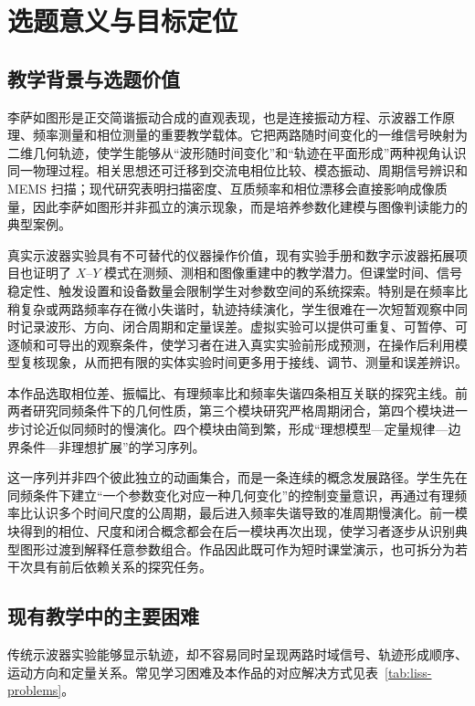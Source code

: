 \documentclass[UTF8,a4paper,zihao=-4]{ctexart}
\begin{document}
\section{选题意义与目标定位}

\subsection{教学背景与选题价值}
李萨如图形是正交简谐振动合成的直观表现，也是连接振动方程、示波器工作原理、频率测量和相位测量的重要教学载体\cite{cena2014,doll2007,hogan2019}。它把两路随时间变化的一维信号映射为二维几何轨迹，使学生能够从“波形随时间变化”和“轨迹在平面形成”两种视角认识同一物理过程。相关思想还可迁移到交流电相位比较、模态振动、周期信号辨识和 MEMS 扫描；现代研究表明扫描密度、互质频率和相位漂移会直接影响成像质量\cite{wang2020,birla2020,janin2022}，因此李萨如图形并非孤立的演示现象，而是培养参数化建模与图像判读能力的典型案例。

真实示波器实验具有不可替代的仪器操作价值，现有实验手册和数字示波器拓展项目也证明了 $X$--$Y$ 模式在测频、测相和图像重建中的教学潜力\cite{uestc,tongji,huang2025}。但课堂时间、信号稳定性、触发设置和设备数量会限制学生对参数空间的系统探索。特别是在频率比稍复杂或两路频率存在微小失谐时，轨迹持续演化，学生很难在一次短暂观察中同时记录波形、方向、闭合周期和定量误差。虚拟实验可以提供可重复、可暂停、可逐帧和可导出的观察条件，使学习者在进入真实实验前形成预测，在操作后利用模型复核现象，从而把有限的实体实验时间更多用于接线、调节、测量和误差辨识。

本作品选取相位差、振幅比、有理频率比和频率失谐四条相互关联的探究主线。前两者研究同频条件下的几何性质，第三个模块研究严格周期闭合，第四个模块进一步讨论近似同频时的慢演化。四个模块由简到繁，形成“理想模型—定量规律—边界条件—非理想扩展”的学习序列。

这一序列并非四个彼此独立的动画集合，而是一条连续的概念发展路径。学生先在同频条件下建立“一个参数变化对应一种几何变化”的控制变量意识，再通过有理频率比认识多个时间尺度的公周期，最后进入频率失谐导致的准周期慢演化。前一模块得到的相位、尺度和闭合概念都会在后一模块再次出现，使学习者逐步从识别典型图形过渡到解释任意参数组合。作品因此既可作为短时课堂演示，也可拆分为若干次具有前后依赖关系的探究任务。

\subsection{现有教学中的主要困难}
传统示波器实验能够显示轨迹，却不容易同时呈现两路时域信号、轨迹形成顺序、运动方向和定量关系。常见学习困难及本作品的对应解决方式见表~\ref{tab:liss-problems}。
\end{document}
